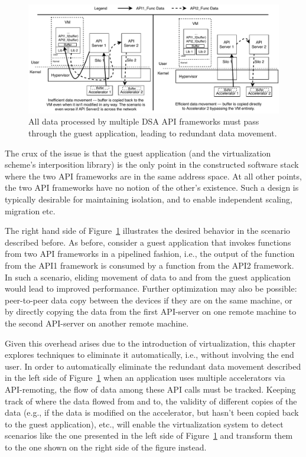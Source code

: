 \begin{figure}[ht!]
  \centering
  \captionsetup{justification=centering,width=\linewidth}
  \includegraphics[width=\linewidth]{figures/vtask-overview.pdf}
  \caption{All data processed by multiple DSA API frameworks must pass through the guest application, leading to redundant data movement.}\label{fig:vtask_overview}
\end{figure}

The crux of the issue is that the guest application (and the virtualization
scheme's interposition library) is the only point in the constructed
software stack where the two API frameworks are in the same address space. At
all other points, the two API frameworks have no notion of the other's
existence. Such a design is typically desirable for maintaining isolation, and
to enable independent scaling, migration etc.

The right hand side of Figure~\ref{fig:vtask_overview} illustrates the desired
behavior in the scenario described before. As before, consider a guest
application that invokes functions from two API frameworks in a pipelined
fashion, i.e., the output of the function from the API1 framework is consumed
by a function from the API2 framework. In such a scenario, eliding movement of
data to and from the guest application would lead to improved performance.
Further optimization may also be possible: peer-to-peer data copy between the
devices if they are on the same machine, or by directly copying the data from
the first API-server on one remote machine to the second API-server on another
remote machine.

Given this overhead arises due to the introduction of virtualization,
this chapter explores techniques to eliminate it automatically, i.e., without
involving the end user.
In order to automatically eliminate the redundant data movement described in
the left side of Figure~\ref{fig:vtask_overview} when an application uses
multiple accelerators via API-remoting, the flow of data among these API calls
must be tracked. Keeping track of where the data flowed from and to, the
validity of different copies of the data (e.g., if the data is modified on the
accelerator, but hasn’t been copied back to the guest application), etc., will
enable the virtualization system to detect scenarios like the one presented in
the left side of Figure~\ref{fig:vtask_overview} and transform them to the one
shown on the right side of the figure instead.

